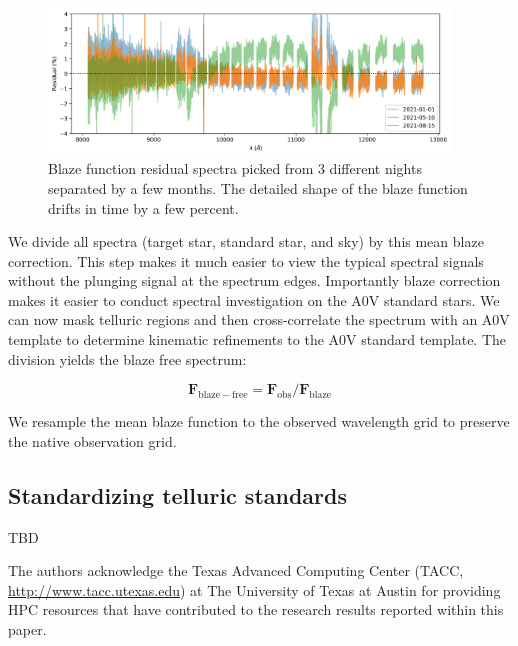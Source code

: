 \documentclass[modern]{aastex631}
\begin{document}
\begin{figure}[ht]
  \centering
  \includegraphics[width=0.95\textwidth]{figures/HPF_blaze_function_variation.png}
\caption{Blaze function residual spectra picked from 3 different nights separated by a few months.  The detailed shape of the blaze function drifts in time by a few percent.}
\label{fig:blaze_variation}
\end{figure}

We divide all spectra (target star, standard star, and sky) by this mean blaze correction.  This step makes it much easier to view the typical spectral signals without the plunging signal at the spectrum edges.  Importantly blaze correction makes it easier to conduct spectral investigation on the A0V standard stars.  We can now mask telluric regions and then cross-correlate the spectrum with an A0V template to determine kinematic refinements to the A0V standard template.  The division yields the blaze free spectrum:

\begin{equation} \label{blaze_correction}
\mathbf{F}_{\mathrm{blaze-free}} = \mathbf{F}_{\mathrm{obs}}/ \mathbf{F}_{\mathrm{blaze}}
\end{equation}

We resample the mean blaze function to the observed wavelength grid to preserve the native observation grid.


\subsection{Standardizing telluric standards}
TBD

  
\begin{acknowledgements}

The authors acknowledge the Texas Advanced Computing Center (TACC, \url{http://www.tacc.utexas.edu}) at The University of Texas at Austin for providing HPC resources that have contributed to the research results reported within this paper.
\end{acknowledgements}

\clearpage






\end{document}
